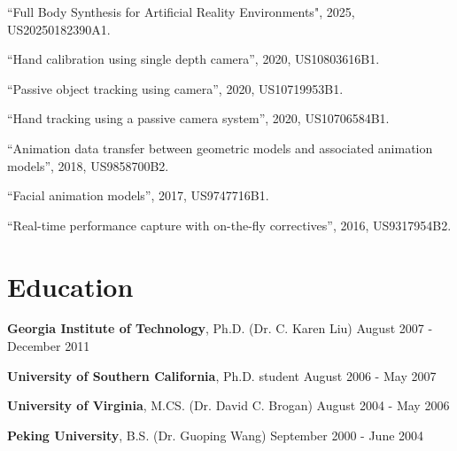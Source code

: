 \documentclass[margin,line]{res}
\newenvironment{list2}{
  \begin{list}{$\bullet$}{%
      \setlength{\itemsep}{0in}
      \setlength{\parsep}{0in} \setlength{\parskip}{0in}
      \setlength{\topsep}{0in} \setlength{\partopsep}{0in} 
      \setlength{\leftmargin}{0.2in}}}{\end{list}}
\begin{document}
\begin{resume}
``Full Body Synthesis for Artificial Reality Environments", 2025, US20250182390A1.

\vspace*{-.1in}
``Hand calibration using single depth camera'', 2020, US10803616B1.

\vspace*{-.1in}
``Passive object tracking using camera'', 2020, US10719953B1.

\vspace*{-.1in}
``Hand tracking using a passive camera system'', 2020, US10706584B1.

\vspace*{-.1in}
``Animation data transfer between geometric models and associated animation models'', 2018, US9858700B2. 

\vspace*{-.1in}
``Facial animation models'', 2017, US9747716B1.  

\vspace*{-.1in}
``Real-time performance capture with on-the-fly correctives'', 2016, US9317954B2.


\section{\sc Education}
{\bf Georgia Institute of Technology}, Ph.D.  (Dr. C. Karen Liu) \hfill August 2007 - December 2011

\vspace*{-.1in}
{\bf University of Southern California}, Ph.D. student \hfill August 2006 - May 2007

\vspace*{-.1in}
{\bf University of Virginia}, M.CS. (Dr. David C. Brogan) \hfill August 2004 - May 2006

\vspace*{-.1in}
{\bf Peking University}, B.S. (Dr. Guoping Wang) \hfill September 2000 - June 2004


\end{resume}
\end{document}
